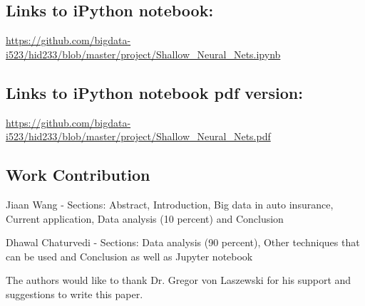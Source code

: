 \subsection{Links to iPython notebook:}

\url{https://github.com/bigdata-i523/hid233/blob/master/project/Shallow_Neural_Nets.ipynb}

\subsection{Links to iPython notebook pdf version:}
\url{https://github.com/bigdata-i523/hid233/blob/master/project/Shallow_Neural_Nets.pdf}

\subsection{Work Contribution}

Jiaan Wang - Sections: Abstract, Introduction, Big data in auto insurance, Current application, Data analysis (10 percent) and Conclusion

Dhawal Chaturvedi - Sections: Data analysis (90 percent), Other techniques that can be used and Conclusion as well as Jupyter notebook


\begin{acks}

  The authors would like to thank Dr. Gregor von Laszewski for his
  support and suggestions to write this paper.

\end{acks}


 

